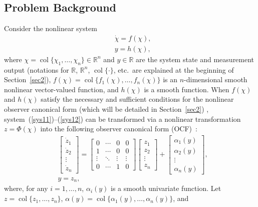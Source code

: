 \documentclass[11pt]{article}
\DeclareMathOperator{\col}{col}
\begin{document}
\subsection{Problem Background}\label{sec1.1}
Consider the nonlinear system
\begin{align}
	&\dot{\chi}=f(\chi),\label{sys11}\\
	&y=h(\chi),\label{sys12}
\end{align}
where $\chi=\col\{\chi_1,\ldots,\chi_n\}\in\mathbb{R}^n$ and $y\in\mathbb{R}$ are the system state and measurement output (notations for $\mathbb{R}$, $\mathbb{R}^n$, $\col\{\cdot\}$, etc.\ are explained at the beginning of Section~\ref{sec2}), $f(\chi)=\col\{f_1(\chi),\ldots,f_n(\chi)\}$ is an $n$-dimensional smooth nonlinear vector-valued function, and $h(\chi)$ is a smooth function. When $f(\chi)$ and $h(\chi)$ satisfy the necessary and sufficient conditions for the nonlinear observer canonical form (which will be detailed in Section~\ref{sec2}) , system~(\ref{sys11})--(\ref{sys12}) can be transformed via a nonlinear transformation $z=\Phi(\chi)$ into the following observer canonical form (OCF)~\cite{Isidori1995}:
\begin{align}
	&\begin{bmatrix}
		\dot{z}_1\\\dot{z}_2\\\vdots\\\dot{z}_n
	\end{bmatrix}=\begin{bmatrix}0&\cdots&0&0\\
								 1&\cdots&0&0\\
								 \vdots&\ddots&\vdots&\vdots\\
								 0&\cdots&1&0
     \end{bmatrix}\begin{bmatrix}
     z_1\\z_2\\\vdots\\z_n
\end{bmatrix}+\begin{bmatrix}
\alpha_1(y)\\\alpha_2(y)\\\vdots\\\alpha_n(y)
\end{bmatrix},\\
&y=z_n,
\end{align}
where, for any $i=1,\ldots,n$, $\alpha_i(y)$ is a smooth univariate function. Let $z=\col\{z_1,\ldots,z_n\}$, $\alpha(y)=\col\{\alpha_1(y),\ldots,\alpha_n(y)\}$, and
\end{document}
